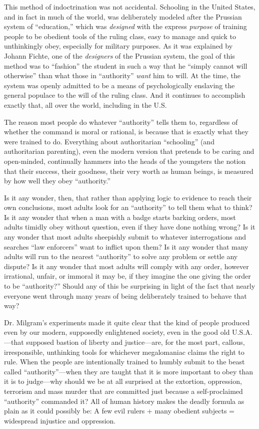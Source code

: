 \documentclass{book}
\begin{document}
This method of indoctrination was not accidental. Schooling in the United States, and in fact in much of the world, was deliberately modeled after the Prussian system of \enquote{education,} which was \emph{designed} with the express \emph{purpose} of training people to be obedient tools of the ruling class, easy to manage and quick to unthinkingly obey, especially for military purposes. As it was explained by Johann Fichte, one of the \emph{designers} of the Prussian system, the goal of this method was to \enquote{fashion} the student in such a way that he \enquote{simply cannot will otherwise} than what those in \enquote{authority} \emph{want} him to will. At the time, the system was openly admitted to be a means of psychologically enslaving the general populace to the will of the ruling class. And it continues to accomplish exactly that, all over the world, including in the U.S.

The reason most people do whatever \enquote{authority} tells them to, regardless of whether the command is moral or rational, is because that is exactly what they were trained to do. Everything about authoritarian \enquote{schooling} (and authoritarian parenting), even the modern version that pretends to be caring and open-minded, continually hammers into the heads of the youngsters the notion that their success, their goodness, their very worth as human beings, is measured by how well they obey \enquote{authority.}

Is it any wonder, then, that rather than applying logic to evidence to reach their own conclusions, most adults look for an \enquote{authority} to tell them what to think? Is it any wonder that when a man with a badge starts barking orders, most adults timidly obey without question, even if they have done nothing wrong? Is it any wonder that most adults sheepishly submit to whatever interrogations and searches \enquote{law enforcers} want to inflict upon them? Is it any wonder that many adults will run to the nearest \enquote{authority} to solve any problem or settle any dispute? Is it any wonder that most adults will comply with any order, however irrational, unfair, or immoral it may be, if they imagine the one giving the order to be \enquote{authority?} Should any of this be surprising in light of the fact that nearly everyone went through many years of being deliberately trained to behave that way?

Dr. Milgram's experiments made it quite clear that the kind of people produced even by our modern, supposedly enlightened society, even in the good old U.S.A.---that supposed bastion of liberty and justice---are, for the most part, callous, irresponsible, unthinking tools for whichever megalomaniac claims the right to rule. When the people are intentionally trained to humbly submit to the beast called \enquote{authority}---when they are taught that it is more important to obey than it is to judge---why should we be at all surprised at the extortion, oppression, terrorism and mass murder that are committed just because a self-proclaimed \enquote{authority} commanded it? All of human history makes the deadly formula as plain as it could possibly be: A few evil rulers + many obedient subjects = widespread injustice and oppression.
\end{document}
